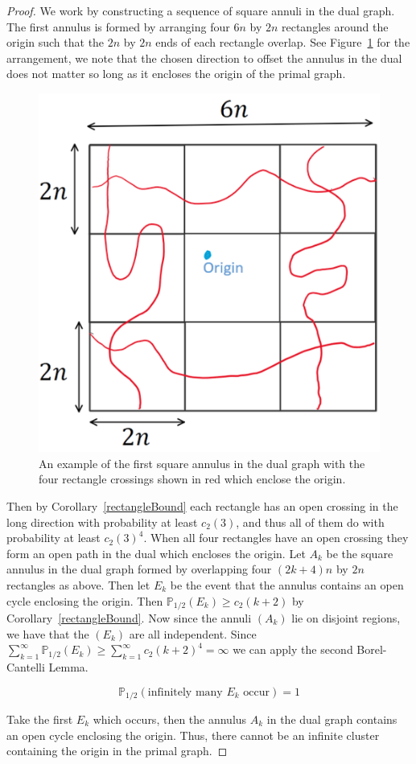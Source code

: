 \documentclass[a4paper,11pt]{article}
\theoremstyle{definition}
\newcommand{\prbhlf}{\mathbb{P}_{1/2}}
\begin{document}
\begin{proof}
	We work by constructing a sequence of square annuli in the dual graph. The first annulus is formed by arranging four $6n$ by $2n$ rectangles around the origin such that the $2n$ by $2n$ ends of each rectangle overlap. See Figure~\ref{fig:squareAnnulus} for the arrangement, we note that the chosen direction to offset the annulus in the dual does not matter so long as it encloses the origin of the primal graph. 
	\begin{figure}
		\centering
		\includegraphics[scale=0.48]{drawings/squareAnnulus.png}
		\caption{An example of the first square annulus in the dual graph with the four rectangle crossings shown in red which enclose the origin.}
		\label{fig:squareAnnulus}

	\end{figure}
	Then by Corollary~\ref{rectangleBound} each rectangle has an open crossing in the long direction with probability at least $c_2(3)$, and thus all of them do with probability at least $c_2(3)^4$. When all four rectangles have an open crossing they form an open path in the dual which encloses the origin. Let $A_k$ be the square annulus in the dual graph formed by overlapping four $(2k+4)n$ by $2n$ rectangles as above. Then let $E_k$ be the event that the annulus contains an open cycle enclosing the origin. Then $\prbhlf(E_k) \geq c_2(k+2)$ by Corollary~\ref{rectangleBound}. Now since the annuli $(A_k)$ lie on disjoint regions, we have that the $(E_k)$ are all independent.
	Since $\sum_{k=1}^{\infty}\prbhlf(E_k) \geq \sum_{k=1}^{\infty}c_2(k+2)^4 = \infty$ we can apply the second Borel-Cantelli Lemma.

	$$\prbhlf(\text{infinitely many }E_k\text{ occur}) = 1$$

	Take the first $E_k$ which occurs, then the annulus $A_k$ in the dual graph contains an open cycle enclosing the origin. Thus, there cannot be an infinite cluster containing the origin in the primal graph.
\end{proof}
\end{document}
